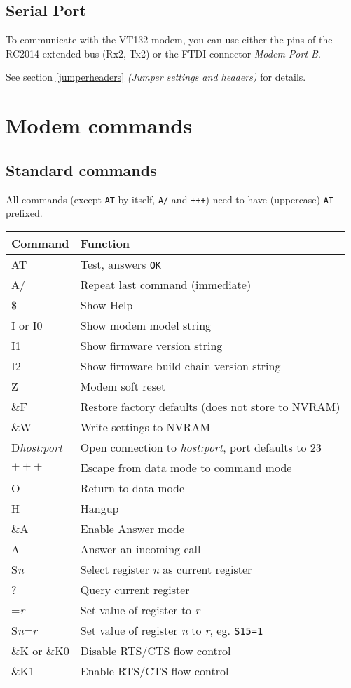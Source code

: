 \subsection{Serial Port}

To communicate with the VT132 modem, you can use either the pins of the RC2014 extended bus (Rx2, Tx2) or the FTDI connector \textit{Modem Port B}.

See section \vref{jumperheaders} \textit{(Jumper settings and headers)} for details.

\newpage
\section{Modem commands}
\subsection{Standard commands}

All commands (except \texttt{AT} by itself, \texttt{A/} and \texttt{+++}) need to have (uppercase) \texttt{AT} prefixed.

\begin{tabular}{p{6em} | p{}}
\hline
\textbf{Command} & \textbf{Function} \\
\hline
AT			& Test, answers \texttt{OK} \\
A/			& Repeat last command (immediate) \\
\$			& Show Help \\
I or I0		& Show modem model string \\
I1			& Show firmware version string \\
I2			& Show firmware build chain version string \\
Z			& Modem soft reset \\
\&F			& Restore factory defaults (does not store to NVRAM) \\
\&W 		& Write settings to NVRAM \\
D\textit{host:port}	& Open connection to \textit{host:port}, port defaults to 23 \\
$+++$		& Escape from data mode to command mode \\
O			& Return to data mode \\
H			& Hangup \\
\&A			& Enable Answer mode \\
A			& Answer an incoming call \\
S\textit{n}	& Select register \textit{n} as current register \\
?			& Query current register \\
=\textit{r}	& Set value of register to \textit{r} \\
S\textit{n}=\textit{r}	& Set value of register \textit{n} to \textit{r}, eg. \texttt{S15=1} \\
\&K or \&K0	& Disable RTS/CTS flow control \\
\&K1		& Enable RTS/CTS flow control \\
\hline
\end{tabular}

